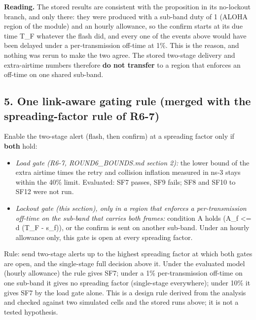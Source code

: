 \textbf{Reading.} The stored results are consistent with the proposition in its no-lockout branch, and only there: they were produced with a sub-band duty of 1 (ALOHA region of the module) and an hourly allowance, so the confirm starts at its due time T\_F whatever the flash did, and every one of the events above would have been delayed under a per-transmission off-time at 1\%. This is the reason, and nothing was rerun to make the two agree. The stored two-stage delivery and extra-airtime numbers therefore \textbf{do not transfer} to a region that enforces an off-time on one shared sub-band.

\subsection*{5. One link-aware gating rule (merged with the spreading-factor rule of R6-7)}

Enable the two-stage alert (flash, then confirm) at a spreading factor only if \textbf{both} hold:
\begin{itemize}
\item \emph{Load gate (R6-7, ROUND6\_BOUNDS.md section 2):} the lower bound of the extra airtime times the retry and collision inflation measured in ns-3 stays within the 40\% limit. Evaluated: SF7 passes, SF9 fails; SF8 and SF10 to SF12 were not run.
\item \emph{Lockout gate (this section), only in a region that enforces a per-transmission off-time on the sub-band that carries both frames:} condition A holds (A\_f <= d (T\_F - s\_f)), or the confirm is sent on another sub-band. Under an hourly allowance only, this gate is open at every spreading factor.
\end{itemize}

Rule: send two-stage alerts up to the highest spreading factor at which both gates are open, and the single-stage full decision above it. Under the evaluated model (hourly allowance) the rule gives SF7; under a 1\% per-transmission off-time on one sub-band it gives no spreading factor (single-stage everywhere); under 10\% it gives SF7 by the load gate alone. This is a design rule derived from the analysis and checked against two simulated cells and the stored runs above; it is not a tested hypothesis.

